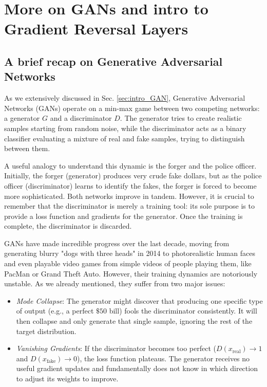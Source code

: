 \section{More on GANs and intro to Gradient Reversal Layers}

\subsection{A brief recap on Generative Adversarial Networks}

As we extensively discussed in Sec. \ref{sec:intro_GAN}, Generative Adversarial Networks (GANs) operate on a min-max game between two competing networks: a generator $G$ and a discriminator $D$. The generator tries to create realistic samples starting from random noise, while the discriminator acts as a binary classifier evaluating a mixture of real and fake samples, trying to distinguish between them. 

A useful analogy to understand this dynamic is the forger and the police officer. Initially, the forger (generator) produces very crude fake dollars, but as the police officer (discriminator) learns to identify the fakes, the forger is forced to become more sophisticated. Both networks improve in tandem. However, it is crucial to remember that the discriminator is merely a training tool: its sole purpose is to provide a loss function and gradients for the generator. Once the training is complete, the discriminator is discarded.

GANs have made incredible progress over the last decade, moving from generating blurry "dogs with three heads" in 2014 to photorealistic human faces and even playable video games from simple videos of people playing them, like PacMan or Grand Theft Auto. However, their training dynamics are notoriously unstable. 
As we already mentioned, they suffer from two major issues:
\begin{itemize}
    \item[-] \textit{Mode Collapse}: The generator might discover that producing one specific type of output (e.g., a perfect $\$50$ bill) fools the discriminator consistently. It will then collapse and only generate that single sample, ignoring the rest of the target distribution.
    \item[-] \textit{Vanishing Gradients}: If the discriminator becomes too perfect ($D(x_{\text{real}}) \to 1$ and $D(x_{\text{fake}}) \to 0$), the loss function plateaus. The generator receives no useful gradient updates and fundamentally does not know in which direction to adjust its weights to improve.
\end{itemize}

